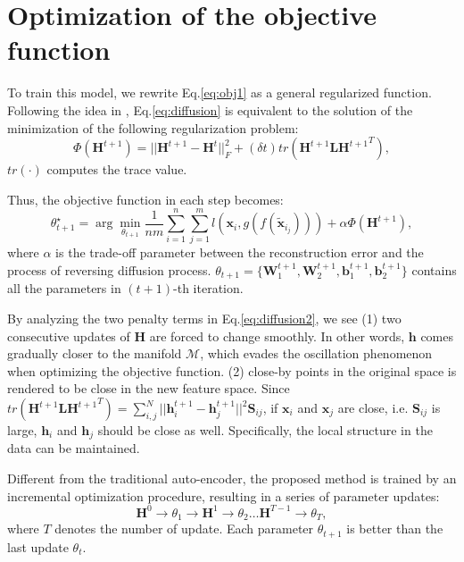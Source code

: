 \documentclass{article}
\def \bb{\mathbf b}
\def \x{\mathbf x}
\def \h{\mathbf h}
\def \HH{\mathbf H}
\def \LL{\mathbf L}
\def \SSS{\mathbf S}
\def \W{\mathbf W}
\def \MM{{\mathcal M}}
\begin{document}
\section{Optimization of the objective function}
To train this model, we rewrite Eq.\ref{eq:obj1} as a general regularized function. Following the idea in \cite{scherzer2000relations}, Eq.\ref{eq:diffusion} is equivalent to the solution of the minimization of the following regularization problem:
\begin{equation}
   \Phi(\HH^{t+1}) = ||\HH^{t+1} - \HH^t||^2_F + (\delta t) tr(\HH^{t+1} \LL {\HH^{t+1}}^T),
    \label{eq:diffusion2}
\end{equation}
$tr(\cdot)$ computes the trace value.

Thus, the objective function in each step becomes:
\begin{equation}
   \theta^{\star}_{t+1}= \arg \min _{\theta_{t+1}}\frac{1}{nm}\sum_{i = 1}^n \sum_{j = 1}^m l(\x_i , g(f(\tilde{\x}_{i_j})))+ \alpha\Phi(\HH^{t+1}),
   \label{eq:obj_final}
\end{equation}
where $\alpha$ is the trade-off parameter between the reconstruction error and the process of reversing diffusion process. $\theta_{t+1} = \{\W_1^{t+1}, \W_2^{t+1}, \bb_1^{t+1}, \bb_2^{t+1}\}$ contains all the parameters in $(t+1)$-th iteration.

By analyzing the two penalty terms in Eq.\ref{eq:diffusion2}, we see (1) two consecutive updates of $\HH$ are forced to change smoothly. In other words, $\h$ comes gradually closer to the manifold $\MM$, which evades the oscillation phenomenon when optimizing the objective function. (2) close-by points in the original space is rendered to be close in the new feature space. Since  $tr(\HH^{t+1} \LL {\HH^{t+1}}^T) = \sum_{i,j}^N ||\h^{t+1}_i - \h^{t+1}_j||^2 \SSS_{ij}$,  if $\x_i$ and $\x_j$ are close, i.e. $\SSS_{ij}$ is large, $\h_i$ and $\h_j$ should be close as well. Specifically, the local structure in the data can be maintained.

Different from the traditional auto-encoder, the proposed method is trained by an incremental optimization procedure, resulting in a series of parameter updates:
\begin{equation}
  \HH^0 \rightarrow \theta_1\rightarrow \HH^1 \rightarrow  \theta_2 \ldots \HH^{T-1} \rightarrow \theta_T,
\end{equation}
where $T$ denotes the number of update. Each parameter $\theta_{t+1}$ is better than the last update $\theta_{t}$.
\end{document}
